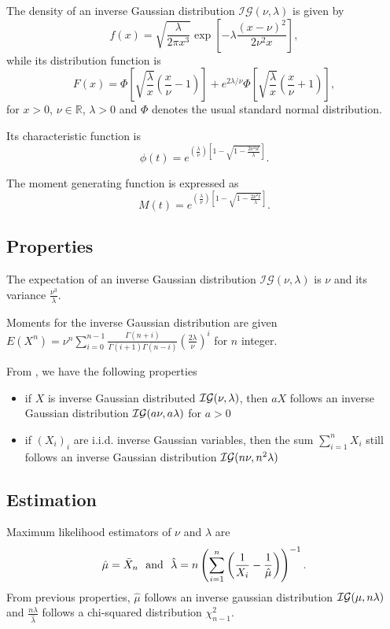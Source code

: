 The density of an inverse Gaussian distribution $\mathcal I \mathcal G(\nu, \lambda)$ is given by
$$
f(x)=\sqrt{\frac{\lambda}{2\pi x^3}}\exp\left[-\lambda\frac{(x-\nu)^2}{2\nu^2 x}\right],
$$
while its distribution function is
$$
F(x)=\Phi\left[\sqrt{\frac{\lambda}{x}}\left(\frac{x}{\nu}-1\right)\right]+e^{2\lambda/\nu}\Phi\left[\sqrt{\frac{\lambda}{x}}\left(\frac{x}{\nu}+1\right)\right],
$$
for $x>0$, $\nu\in\mathbb R$, $\lambda>0$ and $\Phi$ denotes the usual standard normal distribution.

Its characteristic function is 
$$
\phi(t) = e^{\left(\frac{\lambda}{\nu}\right)\left[1-\sqrt{1-\frac{2\nu^2\mathrm{i}t}{\lambda}}\right]}.
$$

The moment generating function is expressed as
$$
M(t) = e^{\left(\frac{\lambda}{\nu}\right)\left[1-\sqrt{1-\frac{2\nu^2t}{\lambda}}\right]}.
$$

\subsection{Properties}
The expectation of an inverse Gaussian distribution $\mathcal I \mathcal G(\nu, \lambda)$ is
$\nu$ and its variance $\frac{\nu^3}{\lambda}$.

Moments for the inverse Gaussian distribution are given 
$E(X^n) = \nu^n \sum_{i=0}^{n-1}\frac{\Gamma(n+i)}{\Gamma(i+1)\Gamma(n-i)} (\frac{2\lambda}{\nu})^i$ for $n$ integer.

From \cite{yu}, we have the following properties
\begin{itemize}
\item if $X$ is inverse Gaussian distributed $\mathcal I \mathcal G(\nu, \lambda)$, then $aX$ follows an inverse Gaussian distribution $\mathcal I \mathcal G(a\nu, a\lambda)$ for $a>0$
\item if $(X_i)_i$ are i.i.d. inverse Gaussian variables, then the sum $\sum_{i=1}^n X_i$ still follows an inverse Gaussian distribution $\mathcal I \mathcal G(n\nu, n^2\lambda)$
\end{itemize}


\subsection{Estimation}
Maximum likelihood estimators of $\nu$ and $\lambda$ are
$$
\hat{\mu}= \bar X_n
\textrm{~~and~~} 
\hat{\lambda}= n \left( \sum_{i=1}^n \left( \frac1{X_i}-\frac1{\hat{\mu}} \right) \right)^{-1}.
$$
From previous properties, $\hat \mu$ follows an inverse gaussian distribution $\mathcal I\mathcal G(\mu,n\lambda)$ and $\frac{n\lambda}{\hat \lambda}$ follows a chi-squared distribution $\chi_{n-1}^2$.


